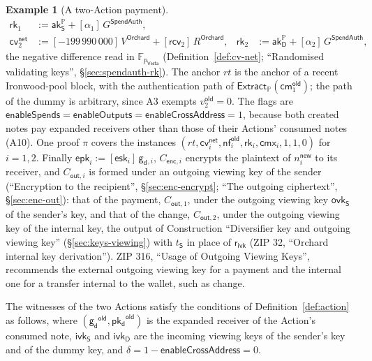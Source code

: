 \documentclass[11pt,a4paper]{article}
\theoremstyle{definition}
\newtheorem{example}[theorem]{Example}
\newcommand{\F}{\mathbb{F}}
\newcommand{\PP}{\mathbb{P}}
\newcommand{\nfsym}{\mathsf{nf}}
\newcommand{\cmsym}{\mathsf{cm}}
\newcommand{\cmx}{\mathsf{cmx}}
\newcommand{\cvsym}{\mathsf{cv}}
\newcommand{\rk}{\mathsf{rk}}
\newcommand{\Vesta}{\ensuremath{\mathsf{Vesta}}}
\newcommand{\Extract}{\ensuremath{\mathsf{Extract}}}
\newcommand{\aksym}{\ensuremath{\mathsf{ak}}}
\newcommand{\ivk}{\ensuremath{\mathsf{ivk}}}
\newcommand{\ovk}{\ensuremath{\mathsf{ovk}}}
\newcommand{\pkd}{\ensuremath{\mathsf{pk_d}}}
\newcommand{\gd}{\ensuremath{\mathsf{g_d}}}
\newcommand{\rcv}{\ensuremath{\mathsf{rcv}}}
\newcommand{\rivk}{\ensuremath{\mathsf{r_{ivk}}}}
\begin{document}
\begin{example}[A two-Action payment]
\begin{align*}
  \rk_1 &:= \aksym^{\PP}_{\mathsf{S}} + [\alpha_1]\,G^{\mathsf{SpendAuth}},
    \\
  \cvsym^{\mathsf{net}}_2 &:= [-199\,990\,000]\,V^{\mathsf{Orchard}}
    + [\rcv_2]\,R^{\mathsf{Orchard}}, &
  \rk_2 &:= \aksym^{\PP}_{\mathsf{D}} + [\alpha_2]\,G^{\mathsf{SpendAuth}},
\end{align*}
the negative difference read in $\F_{p_{\Vesta}}$
(Definition~\ref{def:cv-net}; ``Randomised validating keys'',
\S\ref{sec:spendauth-rk}). The anchor $\mathit{rt}$ is the anchor of a
recent Ironwood-pool block, with the authentication path of
$\Extract_{\PP}(\cmsym^{\mathsf{old}}_1)$; the path of the dummy is
arbitrary, since A3 exempts $v^{\mathsf{old}}_2 = 0$. The flags are
$\mathsf{enableSpends} = \mathsf{enableOutputs} = \mathsf{enableCrossAddress}
= 1$, because both created notes pay expanded receivers other than those of
their Actions' consumed notes (A10). One proof $\pi$ covers the instances
$(\mathit{rt}, \cvsym^{\mathsf{net}}_i, \nfsym^{\mathsf{old}}_i, \rk_i,
\cmx_i, 1, 1, 0)$ for $i = 1, 2$. Finally
$\mathsf{epk}_i := [\mathsf{esk}_i]\,\gd{}_{,i}$, $C_{\mathsf{enc},i}$
encrypts the plaintext of $n^{\mathsf{new}}_i$ to its receiver, and
$C_{\mathsf{out},i}$ is formed under an outgoing viewing key of the sender
(``Encryption to the recipient'', \S\ref{sec:enc-encrypt}; ``The outgoing
ciphertext'', \S\ref{sec:enc-out}): that of the payment, $C_{\mathsf{out},1}$,
under the outgoing viewing key $\ovk_{\mathsf{S}}$ of the sender's key, and
that of the change, $C_{\mathsf{out},2}$, under the outgoing viewing key of
the internal key, the output of Construction ``Diversifier key and outgoing
viewing key'' (\S\ref{sec:keys-viewing}) with $t_{\mathsf{S}}$ in place of
$\rivk$ (ZIP 32, ``Orchard internal key derivation''). ZIP 316, ``Usage of
Outgoing Viewing Keys'', recommends the external outgoing viewing key for a
payment and the internal one for a transfer internal to the wallet, such as
change.

The witnesses of the two Actions satisfy the conditions of
Definition~\ref{def:action} as follows, where
$(\gd^{\mathsf{old}}, \pkd^{\mathsf{old}})$ is the expanded receiver of the
Action's consumed note, $\ivk_{\mathsf{S}}$ and $\ivk_{\mathsf{D}}$ are the
incoming viewing keys of the sender's key and of the dummy key, and
$\delta = 1 - \mathsf{enableCrossAddress} = 0$.


\end{example}
\end{document}
